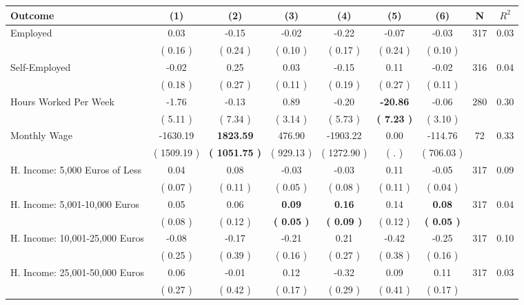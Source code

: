 \begin{tabular}{lcccccccc}
\toprule
 \textbf{Outcome} & \textbf{(1)} & \textbf{(2)} & \textbf{(3)} & \textbf{(4)} & \textbf{(5)} & \textbf{(6)} & \textbf{N} & \textbf{$ R^2$} \\
\midrule
Employed &      0.03 &     -0.15 &     -0.02 &     -0.22 &     -0.07 &     -0.03 & 317 &       0.03 \\ 
 & (     0.16 ) & (     0.24 ) & (     0.10 ) & (     0.17 ) & (     0.24 ) & (     0.10 ) & \\
Self-Employed &     -0.02 &      0.25 &      0.03 &     -0.15 &      0.11 &     -0.02 & 316 &       0.04 \\ 
 & (     0.18 ) & (     0.27 ) & (     0.11 ) & (     0.19 ) & (     0.27 ) & (     0.11 ) & \\
Hours Worked Per Week &     -1.76 &     -0.13 &      0.89 &     -0.20 & \textbf{   -20.86} &     -0.06 & 280 &       0.30 \\ 
 & (     5.11 ) & (     7.34 ) & (     3.14 ) & (     5.73 ) & \textbf{(     7.23 )} & (     3.10 ) & \\
Monthly Wage &  -1630.19 & \textbf{  1823.59} &    476.90 &  -1903.22 &      0.00 &   -114.76 & 72 &       0.33 \\ 
 & (  1509.19 ) & \textbf{(  1051.75 )} & (   929.13 ) & (  1272.90 ) & (        . ) & (   706.03 ) & \\
H. Income: 5,000 Euros of Less &      0.04 &      0.08 &     -0.03 &     -0.03 &      0.11 &     -0.05 & 317 &       0.09 \\ 
 & (     0.07 ) & (     0.11 ) & (     0.05 ) & (     0.08 ) & (     0.11 ) & (     0.04 ) & \\
H. Income: 5,001-10,000 Euros &      0.05 &      0.06 & \textbf{     0.09} & \textbf{     0.16} &      0.14 & \textbf{     0.08} & 317 &       0.04 \\ 
 & (     0.08 ) & (     0.12 ) & \textbf{(     0.05 )} & \textbf{(     0.09 )} & (     0.12 ) & \textbf{(     0.05 )} & \\
H. Income: 10,001-25,000 Euros &     -0.08 &     -0.17 &     -0.21 &      0.21 &     -0.42 &     -0.25 & 317 &       0.10 \\ 
 & (     0.25 ) & (     0.39 ) & (     0.16 ) & (     0.27 ) & (     0.38 ) & (     0.16 ) & \\
H. Income: 25,001-50,000 Euros &      0.06 &     -0.01 &      0.12 &     -0.32 &      0.09 &      0.11 & 317 &       0.03 \\ 
 & (     0.27 ) & (     0.42 ) & (     0.17 ) & (     0.29 ) & (     0.41 ) & (     0.17 ) & \\

\end{tabular}
